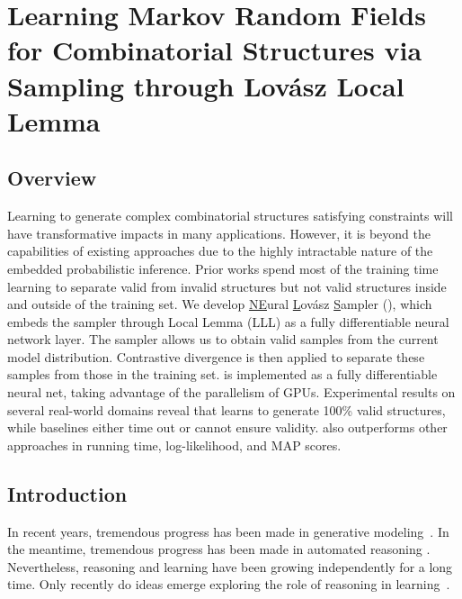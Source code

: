 \chapter{Learning Markov Random Fields for Combinatorial Structures via
  Sampling through Lov\'asz Local Lemma} %
\section*{Overview}
Learning to generate complex combinatorial structures satisfying constraints
will have transformative impacts in many applications. However, it is beyond
the capabilities of existing approaches due to the highly intractable nature of
the embedded probabilistic inference. Prior works spend most of the training
time learning to separate valid from invalid structures but not valid
structures inside and outside of the training set. We develop
\underline{NE}ural \underline{L}ov\'asz \underline{S}ampler (\nls), which
embeds the sampler through \lovasz Local Lemma (LLL) as a fully differentiable
neural network layer. The \nls sampler allows us to obtain valid samples from
the current model distribution. Contrastive divergence is then applied to
separate these samples from those in the training set. \nls is implemented as a
fully differentiable neural net, taking advantage of the parallelism of GPUs.
Experimental results on several real-world domains reveal that \nls learns to
generate 100\% valid structures, while baselines either time out or cannot
ensure validity. \nls also outperforms other approaches in running time,
log-likelihood, and MAP scores.
\section{Introduction}
In recent years, tremendous progress has been made in generative
modeling~\citep{DBLP:journals/neco/Hinton02,Tsochantaridis2005StructualSVM,goodfellow2014generative,kingma2013auto,Germain2015MADEMA,Larochelle2011Autoregressive,Oord2016PixelRN,arjovsky17WGAN,song2019generative,song21scoredifussion,murphy1999loopy,yedidia2001generalized,wainwright2006relaxation}.
In the meantime, tremendous progress has been made in automated reasoning
\citep{Braunstein2005SurveyPA,AnHaHoTi2007,chavira2006compiling,VanHentenryck1989,GOGATE2012AndOr,Sang2005}. %
%
Nevertheless, reasoning and learning have been growing independently for a long
time. Only recently do ideas emerge exploring the role of reasoning in
learning~\citep{kusner17GrammarVAE,Jin2018JunctionTV,Dai2018SyntaxDirectedVA,Hu17ControlledTextGen,lowd2008learning,DBLP:conf/icml/DingMXX21}.


